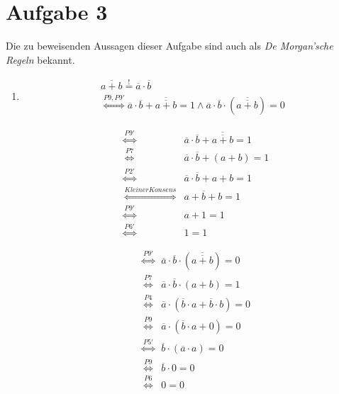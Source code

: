 \documentclass[a4paper]{article}
\begin{document}
\section*{Aufgabe 3}
Die zu beweisenden Aussagen dieser Aufgabe sind auch als \textit{De Morgan'sche Regeln} bekannt.

\begin{enumerate}[label=\alph*)]
	\item
	\begin{equation}
		\begin{aligned}
		\overline{a + b} \stackrel{!}{=} \overline{a} \cdot \overline{b} \\
		\stackrel{P9, P9'}{\Longleftrightarrow} \overline{a} \cdot \overline{b} + \overline{\overline{a + b}} = 1 \wedge \overline{a} \cdot \overline{b} \cdot (\overline{\overline{a + b}}) = 0 
		\end{aligned}
	\end{equation}
	
	\begin{equation}
	\begin{aligned}
		&\stackrel{P9'}{\Longleftrightarrow} &\overline{a} \cdot \overline{b} + \overline{\overline{a+b}} = 1 \\
		&\stackrel{P7}{\Longleftrightarrow} &\overline{a} \cdot \overline{b} + (a + b) = 1 \\
		&\stackrel{P2'}{\Longleftrightarrow} &\overline{a} \cdot \overline{b} + a + b = 1 \\
		&\stackrel{Kleiner Konsens}{\Longleftrightarrow} &a + \overline{b} + b = 1 \\
		&\stackrel{P9'}{\Longleftrightarrow} &a + 1 = 1 \\
		&\stackrel{P6'}{\Longleftrightarrow} &1 = 1
	\end{aligned}
	\end{equation}
	
	\begin{equation}
	\begin{aligned}
		&\stackrel{P9'}{\Longleftrightarrow} &\overline{a} \cdot \overline{b} \cdot (\overline{\overline{a+b}}) = 0 \\
		&\stackrel{P7}{\Longleftrightarrow} &\overline{a} \cdot \overline{b} \cdot (a + b) = 1 \\
		&\stackrel{P4}{\Longleftrightarrow} &\overline{a} \cdot (\overline{b} \cdot a + \overline{b} \cdot b) = 0
		\\
		&\stackrel{P9}{\Longleftrightarrow} &\overline{a} \cdot (\overline{b} \cdot a + 0) = 0
		\\
		&\stackrel{P5'}{\Longleftrightarrow} &\overline{b} \cdot (\overline{a} \cdot a) = 0
		\\
		&\stackrel{P9}{\Longleftrightarrow} &\overline{b} \cdot 0 = 0
		\\
		&\stackrel{P6}{\Longleftrightarrow} &0 = 0
	\end{aligned}
	\end{equation}


\end{enumerate}
\end{document}
